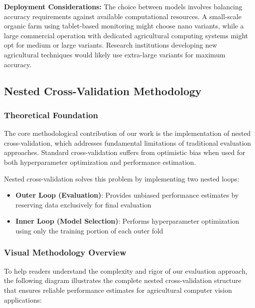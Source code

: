 \textbf{Deployment Considerations:} The choice between models involves balancing accuracy requirements against available computational resources. A small-scale organic farm using tablet-based monitoring might choose nano variants, while a large commercial operation with dedicated agricultural computing systems might opt for medium or large variants. Research institutions developing new agricultural techniques would likely use extra-large variants for maximum accuracy.

\subsection{Nested Cross-Validation Methodology}

\subsubsection{Theoretical Foundation}

The core methodological contribution of our work is the implementation of nested cross-validation, which addresses fundamental limitations of traditional evaluation approaches. Standard cross-validation suffers from optimistic bias when used for both hyperparameter optimization and performance estimation.

Nested cross-validation solves this problem by implementing two nested loops:
\begin{itemize}
    \item \textbf{Outer Loop (Evaluation)}: Provides unbiased performance estimates by reserving data exclusively for final evaluation
    \item \textbf{Inner Loop (Model Selection)}: Performs hyperparameter optimization using only the training portion of each outer fold
\end{itemize}

\subsubsection{Visual Methodology Overview}

To help readers understand the complexity and rigor of our evaluation approach, the following diagram illustrates the complete nested cross-validation structure that ensures reliable performance estimates for agricultural computer vision applications:

